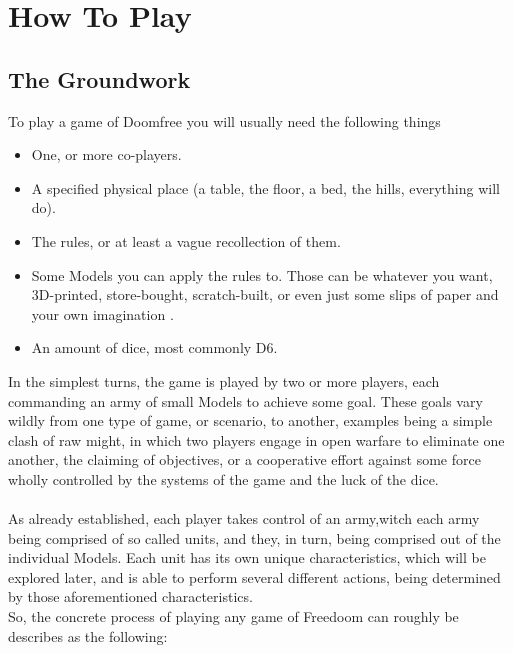 \documentclass[a4paper,12pt]{book}
\begin{document}
\chapter{How To Play}

\section {The Groundwork}
To play a game of Doomfree you will usually need the following things

\begin{adjustwidth}{-2cm}{-2cm}
\begin{multicols}{3}
\begin{itemize}

	\item One, or more co-players.
	\item A specified physical place (a table, the floor, a bed, the hills, everything will do).
	\item The rules, or at least a vague recollection of them.
	\item Some Models you can apply the rules to. Those can be whatever you want, 3D-printed, store-bought, scratch-built, or even just some slips of paper and your own imagination .
	\item An amount of dice, most commonly D6.
	
\end{itemize}
\end{multicols}
\end{adjustwidth}


In the simplest turns, the game is played by two or more  players, each commanding an army of small Models to achieve some goal. These goals vary wildly from one type of game, or scenario, to another, examples being a simple clash of raw might, in which two players engage in open warfare to eliminate one another, the claiming of objectives, or a cooperative effort against some force wholly controlled by the systems of the game and the luck of the dice.\\
\\

As already established, each player takes control of an army,witch each army being comprised of so called units, and they, in turn, being comprised out of the individual Models. Each unit has its own unique characteristics, which will be explored later, and is able to perform several different actions,  being determined by those aforementioned characteristics.\\
\newpage
So, the concrete process of playing any game of Freedoom can roughly be describes as the following:\\
\end{document}
